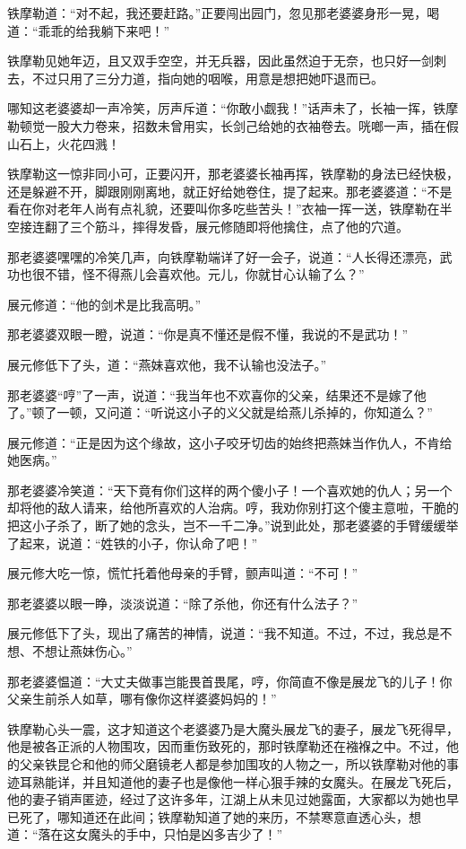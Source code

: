 \documentclass[12pt,oneside]{book}
\begin{document}
铁摩勒道：``对不起，我还要赶路。''正要闯出园门，忽见那老婆婆身形一晃，喝道：``乖乖的给我躺下来吧！''

铁摩勒见她年迈，且又双手空空，并无兵器，因此虽然迫于无奈，也只好一剑刺去，不过只用了三分力道，指向她的咽喉，用意是想把她吓退而已。

哪知这老婆婆却一声冷笑，厉声斥道：``你敢小觑我！''话声未了，长袖一挥，铁摩勒顿觉一股大力卷来，招数未曾用实，长剑己给她的衣袖卷去。咣啷一声，插在假山石上，火花四溅！

铁摩勒这一惊非同小可，正要闪开，那老婆婆长袖再挥，铁摩勒的身法已经快极，还是躲避不开，脚跟刚刚离地，就正好给她卷住，提了起来。那老婆婆道：``不是看在你对老年人尚有点礼貌，还要叫你多吃些苦头！''衣袖一挥一送，铁摩勒在半空接连翻了三个筋斗，摔得发昏，展元修随即将他擒住，点了他的穴道。

那老婆婆嘿嘿的冷笑几声，向铁摩勒端详了好一会子，说道：``人长得还漂亮，武功也很不错，怪不得燕儿会喜欢他。元儿，你就甘心认输了么？''

展元修道：``他的剑术是比我高明。''

那老婆婆双眼一瞪，说道：``你是真不懂还是假不懂，我说的不是武功！''

展元修低下了头，道：``燕妹喜欢他，我不认输也没法子。''

那老婆婆``哼''了一声，说道：``我当年也不欢喜你的父亲，结果还不是嫁了他了。''顿了一顿，又问道：``听说这小子的义父就是给燕儿杀掉的，你知道么？''

展元修道：``正是因为这个缘故，这小子咬牙切齿的始终把燕妹当作仇人，不肯给她医病。''

那老婆婆冷笑道：``天下竟有你们这样的两个傻小子！一个喜欢她的仇人；另一个却将他的敌人请来，给他所喜欢的人治病。哼，我劝你别打这个傻主意啦，干脆的把这小子杀了，断了她的念头，岂不一千二净。''说到此处，那老婆婆的手臂缓缓举了起来，说道：``姓铁的小子，你认命了吧！''

展元修大吃一惊，慌忙托着他母亲的手臂，颤声叫道：``不可！''

那老婆婆以眼一睁，淡淡说道：``除了杀他，你还有什么法子？''

展元修低下了头，现出了痛苦的神情，说道：``我不知道。不过，不过，我总是不想、不想让燕妹伤心。''

那老婆婆愠道：``大丈夫做事岂能畏首畏尾，哼，你简直不像是展龙飞的儿子！你父亲生前杀人如草，哪有像你这样婆婆妈妈的！''

铁摩勒心头一震，这才知道这个老婆婆乃是大魔头展龙飞的妻子，展龙飞死得早，他是被各正派的人物围攻，因而重伤致死的，那时铁摩勒还在襁褓之中。不过，他的父亲铁昆仑和他的师父磨镜老人都是参加围攻的人物之一，所以铁摩勒对他的事迹耳熟能详，并且知道他的妻子也是像他一样心狠手辣的女魔头。在展龙飞死后，他的妻子销声匿迹，经过了这许多年，江湖上从未见过她露面，大家都以为她也早已死了，哪知道还在此间；铁摩勒知道了她的来历，不禁寒意直透心头，想道：``落在这女魔头的手中，只怕是凶多吉少了！''
\end{document}
